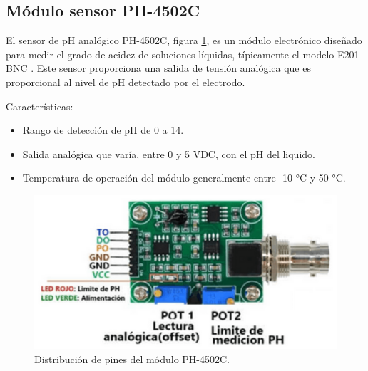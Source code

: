 \subsection{Módulo sensor PH-4502C}
El sensor de pH analógico PH-4502C, figura \ref{fig:ph}, es un módulo electrónico diseñado para medir el grado de acidez de soluciones líquidas, típicamente el modelo E201-BNC \cite{PH:4502C}. Este sensor proporciona una salida de tensión analógica que es proporcional al nivel de pH detectado por el electrodo.

Características:

\begin{itemize}
	\item Rango de detección de pH de 0 a 14.
	\item Salida analógica que varía, entre 0 y 5 VDC, con el pH del liquido.
	\item Temperatura de operación del módulo generalmente entre -10 °C y 50 °C.
\end{itemize}

\begin{figure}[h]
\centering
\includegraphics[scale=.5]{./Figures/ph.png}
	\caption{Distribución de pines del módulo PH-4502C\protect\footnotemark.}
	\label{fig:ph}
\end{figure}




